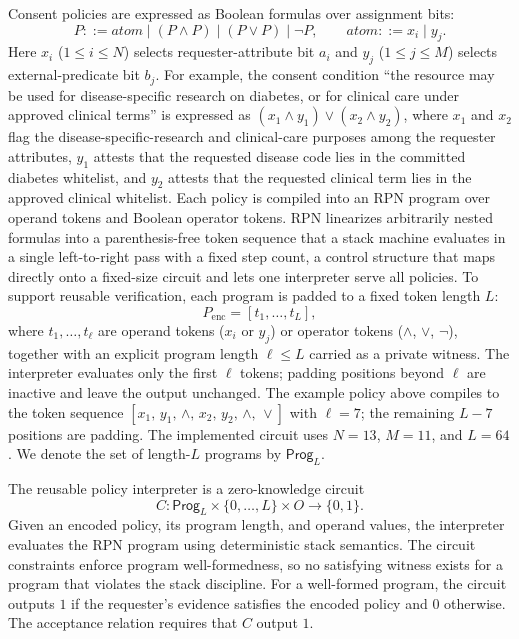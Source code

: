Consent policies are expressed as Boolean formulas over assignment bits:
\begin{equation}
	P ::= \mathit{atom} \mid (P \land P) \mid (P \lor P) \mid \neg P,\qquad
	\mathit{atom} ::= x_i \mid y_j .
\end{equation}
Here $x_i$ ($1 \le i \le N$) selects requester-attribute bit $a_i$ and $y_j$ ($1 \le j \le M$) selects external-predicate bit $b_j$.
For example, the consent condition ``the resource may be used for disease-specific research on diabetes, or for clinical care under approved clinical terms'' is expressed as $(x_1 \land y_1) \lor (x_2 \land y_2)$, where $x_1$ and $x_2$ flag the disease-specific-research and clinical-care purposes among the requester attributes, $y_1$ attests that the requested disease code lies in the committed diabetes whitelist, and $y_2$ attests that the requested clinical term lies in the approved clinical whitelist.
Each policy is compiled into an RPN program over operand tokens and Boolean operator tokens.
RPN linearizes arbitrarily nested formulas into a parenthesis-free token sequence that a stack machine evaluates in a single left-to-right pass with a fixed step count, a control structure that maps directly onto a fixed-size circuit and lets one interpreter serve all policies.
To support reusable verification, each program is padded to a fixed token length $L$:
\begin{equation}
	P_{\mathrm{enc}}= [t_{1},\ldots,t_{L}],
\end{equation}
where $t_1,\ldots,t_\ell$ are operand tokens ($x_i$ or $y_j$) or operator tokens ($\land$, $\lor$, $\neg$), together with an explicit program length $\ell \le L$ carried as a private witness.
The interpreter evaluates only the first $\ell$ tokens; padding positions beyond $\ell$ are inactive and leave the output unchanged.
The example policy above compiles to the token sequence $[x_1,\, y_1,\, \land,\, x_2,\, y_2,\, \land,\, \lor]$ with $\ell = 7$; the remaining $L-7$ positions are padding.
The implemented circuit uses $N=13$, $M=11$, and $L=64$.
We denote the set of length-$L$ programs by $\mathsf{Prog}_{L}$.

The reusable policy interpreter is a zero-knowledge circuit
\begin{equation}
	C : \mathsf{Prog}_{L}\times \{0,\ldots,L\} \times O \rightarrow \{0,1\}.
\end{equation}
Given an encoded policy, its program length, and operand values, the interpreter evaluates the RPN program using deterministic stack semantics.
The circuit constraints enforce program well-formedness, so no satisfying witness exists for a program that violates the stack discipline.
For a well-formed program, the circuit outputs $1$ if the requester's evidence satisfies the encoded policy and $0$ otherwise.
The acceptance relation requires that $C$ output $1$.


